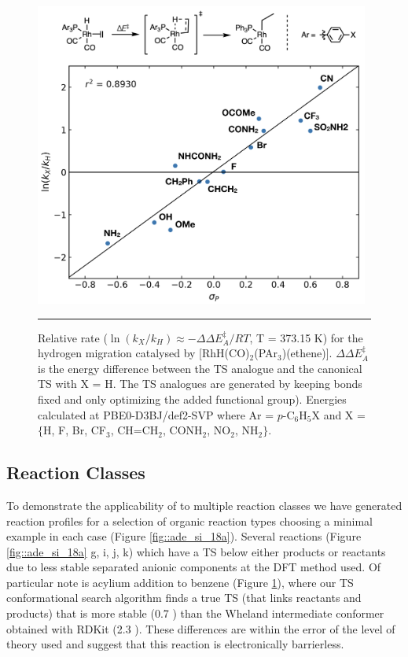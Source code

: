 \documentclass[../../main.tex]{subfiles}
\begin{document}
\begin{figure}[h!]
	\vspace{0.4cm}
	\centering
	\includegraphics[width=11cm]{5/autode/figs/figS17}
	\vspace{0.2cm}
	\hrule
	\caption{Relative rate ($\ln(k_X/k_H) \approx -\Delta\Delta E_A^\ddagger/RT$, T = 373.15 K) for the hydrogen migration catalysed by [RhH(CO)$_2$(PAr$_3$)(ethene)]. $\Delta\Delta E_A^\ddagger$ is the energy difference between the TS analogue and the canonical TS with X = H. The TS analogues are generated by keeping bonds fixed and only optimizing the added functional group). Energies calculated at PBE0-D3BJ/def2-SVP where Ar = $p$-C$_6$H$_5$X and X = $\{$H, F, Br, CF$_3$, CH=CH${}_2$, CONH$_2$, NO$_2$, NH$_2$$\}$.}
	\label{fig::ade_si_17}
\end{figure}


\clearpage
\subsection{Reaction Classes}

To demonstrate the applicability of \ade to multiple reaction classes we have generated reaction profiles for a selection of organic reaction types choosing a minimal example in each case (Figure \ref{fig::ade_si_18a}). Several reactions (Figure \ref{fig::ade_si_18a} g, i, j, k) which have a TS below either products or reactants due to less stable separated anionic components at the DFT method used. Of particular note is acylium addition to benzene (Figure \ref{fig::ade_si_17}), where our TS conformational search algorithm finds a true TS (that links reactants and products) that is more stable (0.7 \kcal) than the Wheland intermediate conformer obtained with RDKit (2.3 \kcal). These differences are within the error of the level of theory used and suggest that this reaction is electronically barrierless. 
\end{document}
